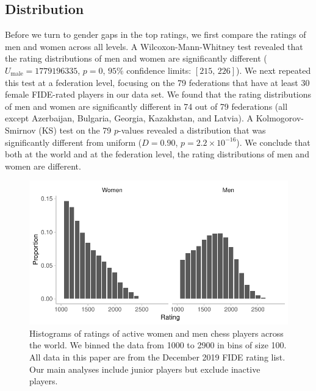\documentclass[9pt,twocolumn,twoside,lineno]{pnas-new}
\begin{document}
\subsection*{Distribution} 
Before we turn to gender gaps in the top ratings, we first compare the ratings of men and women across all levels. A Wilcoxon-Mann-Whitney test revealed that the rating distributions of men and women are significantly different ($U_\mathrm{male} = 1779196335$, $p = 0$, $95\%$ confidence limits: $[215, \, 226]$). We next repeated this test at a federation level, focusing on the 79 federations that have at least 30 female FIDE-rated players in our data set. We found that the rating distributions of men and women are significantly different in 74 out of 79 federations (all except Azerbaijan, Bulgaria, Georgia, Kazakhstan, and Latvia). A Kolmogorov-Smirnov (KS) test on the 79 $p$-values revealed a distribution that was significantly different from uniform ($D = 0.90$, $p = 2.2 \times 10^{-16}$). We conclude that both at the world and at the federation level, the  rating distributions of men and women are different.

 \begin{figure}[!ht]
     \centering
     \includegraphics[width = \linewidth]{fig_1_w_jun_no_ina.pdf}
     \caption{Histograms of ratings of active women and men chess players across the world. We binned the data from 1000 to 2900 in bins of size 100. All data in this paper are from the December 2019 FIDE rating list. Our main analyses include junior players but exclude inactive players.}
     \label{fig:summ_stats}
 \end{figure}
 
\end{document}
